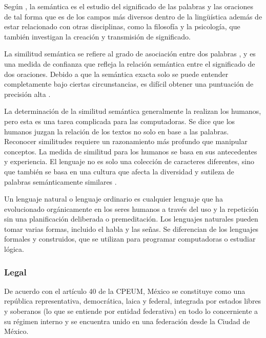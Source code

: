 \documentclass[12pt]{article}
\begin{document}
		Según \cite{Saeed2011}, la semántica es el estudio del significado de las palabras y las oraciones de tal forma que es de los campos más diversos dentro de la lingüística además de estar relacionado con otras disciplinas, como la filosofía y la psicología, que también investigan la creación y transmisión de significado.		

		La similitud semántica se refiere al grado de asociación entre dos palabras \cite{Butz2011}, y es una medida de confianza que refleja la relación semántica entre el significado de dos oraciones. Debido a que la semántica exacta solo se puede entender completamente bajo ciertas circunstancias, es difícil obtener una puntuación de precisión alta \cite{Sombattheera2013}. 
			
		La determinación de la similitud semántica generalmente la realizan los humanos, pero esta es una tarea complicada para las computadoras. Se dice que los humanos juzgan la relación de los textos no solo en base a las palabras. Reconocer similitudes requiere un razonamiento más profundo que manipular conceptos. La medida de similitud para los humanos se basa en sus antecedentes y experiencia. El lenguaje no es solo una colección de caracteres diferentes, sino que también se basa en una cultura que afecta la diversidad y sutileza de palabras semánticamente similares \cite{Butz2011}.			

		Un lenguaje natural o lenguaje ordinario es cualquier lenguaje que ha evolucionado orgánicamente en los seres humanos a través del uso y la repetición sin una planificación deliberada o premeditación. Los lenguajes naturales pueden tomar varias formas, incluido el habla y las señas. Se diferencian de los lenguajes formales y construidos, que se utilizan para programar computadoras o estudiar lógica. \cite{Lyons1991}
		
		
		\subsubsection{Legal}
		De acuerdo con el artículo 40 de la CPEUM, México se constituye como una república representativa, democrática, laica y federal, integrada por estados libres y soberanos (lo que se entiende por entidad federativa) en todo lo concerniente a su régimen interno y se encuentra unido en una federación desde la Ciudad de México.\cite{CPEUM2020}
		
		
		
		
\end{document}
